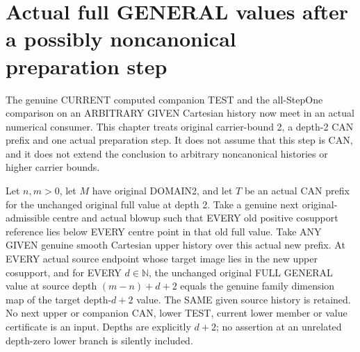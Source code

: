 \section{Actual full GENERAL values after a possibly noncanonical preparation step}

The genuine CURRENT computed companion TEST and the all-StepOne comparison
on an ARBITRARY GIVEN Cartesian history now meet in an actual numerical
consumer. This chapter treats original carrier-bound 2, a depth-2 CAN
prefix and one actual preparation step. It does not assume that this step
is CAN, and it does not extend the conclusion to arbitrary noncanonical
histories or higher carrier bounds.

\begin{theorem}
\label{hir:original-domain-two-prepared-full-general-smooth-values}
\leanok
Let $n,m>0$, let $M$ have original DOMAIN2, and let $T$ be an actual CAN
prefix for the unchanged original full value at depth 2. Take a genuine
next original-admissible centre and actual blowup such that EVERY old
positive cosupport reference lies below EVERY centre point in that old
full value. Take ANY GIVEN genuine smooth Cartesian upper history over
this actual new prefix. At EVERY actual source endpoint whose target
image lies in the new upper cosupport, and for EVERY $d\in\mathbb N$, the
unchanged original FULL GENERAL value at source depth $(m-n)+d+2$ equals
the genuine family dimension map of the target depth-$d+2$ value. The SAME
given source history is retained. No next upper or companion CAN, lower
TEST, current lower member or value certificate is an input. Depths are
explicitly $d+2$; no assertion at an unrelated depth-zero lower branch is
silently included.
\end{theorem}
